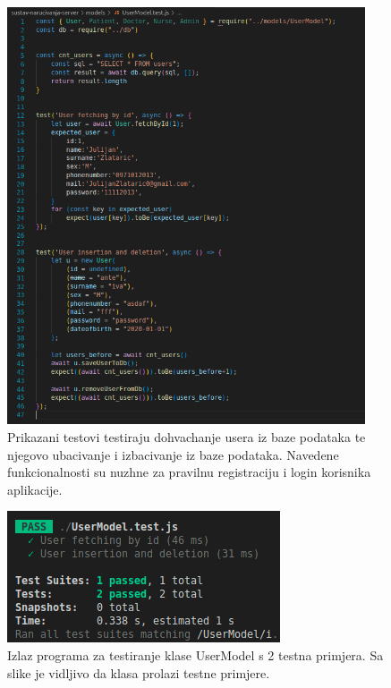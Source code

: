             \begin{figure}[H]
                    \includegraphics[width=300pt]{slike/usermodel_tests_code.png} %
                    \caption{Prikazani testovi testiraju dohvachanje usera iz baze podataka te njegovo ubacivanje i izbacivanje iz baze podataka. Navedene funkcionalnosti su nuzhne za pravilnu registraciju i login korisnika aplikacije.}
                    \label{fig:struktura} %
                \end{figure}

                \begin{figure}[H]
                    \includegraphics[width=\textwidth]{slike/usermodel_tests_out.png} %
                    \caption{Izlaz programa za testiranje klase UserModel s 2 testna primjera. Sa slike je vidljivo da klasa prolazi testne primjere.}
                    \label{fig:struktura} %
                \end{figure}

